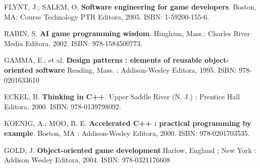 \begin{thebibliography}{99}
        FLYNT, J.; SALEM, O. \textbf{Software engineering for game developers}. Boston, MA: Course Technology PTR Editora, 2005. ISBN: 1-59200-155-6.
 
        RABIN, S. \textbf{AI game programming wisdom}. Hingham, Mass.: Charles River Media Editora, 2002. ISBN: 978-1584500773.
 
 
GAMMA, E.; et al. \textbf{Design patterns : elements of reusable object-oriented software} Reading, Mass. : Addison-Wesley Editora, 1995. ISBN: 978-0201633610
 
        ECKEL, B. \textbf{Thinking in C++}. Upper Saddle River (N. J.) : Prentice Hall Editora. 2000. ISBN: 978-0139798092.
 
        KOENIG, A.; MOO, B. E. \textbf{Accelerated C++ : practical programming by example}. Boston, MA : Addison-Wesley Editora, 2000. ISBN: 978-0201703535.

        GOLD, J. \textbf{Object-oriented game development}.Harlow, England ; New York : Addison Wesley Editora, 2004. ISBN: 978-0321176608
 
\end{thebibliography}
